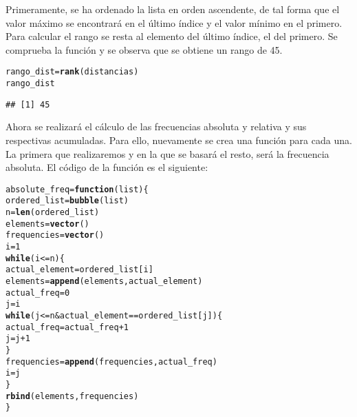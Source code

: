 \documentclass[12pt]{report}\usepackage[]{graphicx}\usepackage[dvipsnames]{xcolor}
\makeatletter
\newcommand{\hlnum}[1]{\textcolor[rgb]{0.686,0.059,0.569}{#1}}%
\newcommand{\hlopt}[1]{\textcolor[rgb]{0,0,0}{#1}}%
\newcommand{\hlstd}[1]{\textcolor[rgb]{0.345,0.345,0.345}{#1}}%
\newcommand{\hlkwa}[1]{\textcolor[rgb]{0.161,0.373,0.58}{\textbf{#1}}}%
\newcommand{\hlkwb}[1]{\textcolor[rgb]{0.69,0.353,0.396}{#1}}%
\newcommand{\hlkwc}[1]{\textcolor[rgb]{0.333,0.667,0.333}{#1}}%
\newcommand{\hlkwd}[1]{\textcolor[rgb]{0.737,0.353,0.396}{\textbf{#1}}}%
\newenvironment{kframe}{%
 \def\at@end@of@kframe{}%
 \ifinner\ifhmode%
  \def\at@end@of@kframe{\end{minipage}}%
  \begin{minipage}{\columnwidth}%
 \fi\fi%
 \def\FrameCommand##1{\hskip\@totalleftmargin \hskip-\fboxsep
 \colorbox{shadecolor}{##1}\hskip-\fboxsep
     \hskip-\linewidth \hskip-\@totalleftmargin \hskip\columnwidth}%
 \MakeFramed {\advance\hsize-\width
   \@totalleftmargin\z@ \linewidth\hsize
   \@setminipage}}%
 {\par\unskip\endMakeFramed%
 \at@end@of@kframe}
\newenvironment{knitrout}{}{} %
\makeatother
\begin{document}
			Primeramente, se ha ordenado la lista en orden ascendente, de tal forma que el valor máximo se encontrará en el último índice y el valor mínimo en el primero. Para calcular el rango se resta al elemento del último índice, el del primero. Se comprueba la función y se observa que se obtiene un rango de 45.
			
\begin{knitrout}
\color{fgcolor}\begin{kframe}
\begin{alltt}
\hlstd{rango_dist} \hlkwb{=} \hlkwd{rank}\hlstd{(distancias)}
\hlstd{rango_dist}
\end{alltt}
\begin{verbatim}
## [1] 45
\end{verbatim}
\end{kframe}
\end{knitrout}
			
			Ahora se realizará el cálculo de las frecuencias absoluta y relativa y sus respectivas acumuladas. Para ello, nuevamente se crea una función para cada una. La primera que realizaremos y en la que se basará el resto, será la frecuencia absoluta. El código de la función es el siguiente:
			
\begin{knitrout}
\color{fgcolor}\begin{kframe}
\begin{alltt}
\hlstd{absolute_freq} \hlkwb{=} \hlkwa{function}\hlstd{(}\hlkwc{list}\hlstd{)\{}
        \hlstd{ordered_list} \hlkwb{=} \hlkwd{bubble}\hlstd{(list)}
        \hlstd{n} \hlkwb{=} \hlkwd{len}\hlstd{(ordered_list)}
        \hlstd{elements} \hlkwb{=} \hlkwd{vector}\hlstd{()}
        \hlstd{frequencies} \hlkwb{=} \hlkwd{vector}\hlstd{()}
        \hlstd{i} \hlkwb{=} \hlnum{1}
        \hlkwa{while} \hlstd{(i} \hlopt{<=} \hlstd{n)\{}
                \hlstd{actual_element} \hlkwb{=} \hlstd{ordered_list[i]}
                \hlstd{elements} \hlkwb{=} \hlkwd{append}\hlstd{(elements, actual_element)}
                \hlstd{actual_freq} \hlkwb{=} \hlnum{0}
                \hlstd{j} \hlkwb{=} \hlstd{i}
                \hlkwa{while}\hlstd{(j} \hlopt{<=} \hlstd{n} \hlopt{&} \hlstd{actual_element} \hlopt{==} \hlstd{ordered_list[j])\{}
                        \hlstd{actual_freq} \hlkwb{=} \hlstd{actual_freq} \hlopt{+} \hlnum{1}
                        \hlstd{j} \hlkwb{=} \hlstd{j}\hlopt{+}\hlnum{1}
                \hlstd{\}}
                \hlstd{frequencies} \hlkwb{=} \hlkwd{append}\hlstd{(frequencies, actual_freq)}
                \hlstd{i} \hlkwb{=} \hlstd{j}
        \hlstd{\}}
        \hlkwd{rbind}\hlstd{(elements, frequencies)}
\hlstd{\}}
\end{alltt}
\end{kframe}
\end{knitrout}
			
\end{document}
